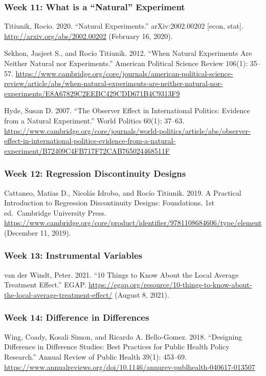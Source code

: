 \documentclass[
  11pt,
]{article}
\begin{document}
\hypertarget{week-11-what-is-a-natural-experiment}{%
\subsubsection{Week 11: What is a ``Natural''
Experiment}\label{week-11-what-is-a-natural-experiment}}

Titiunik, Rocio. 2020. ``Natural Experiments.'' arXiv:2002.00202
{[}econ, stat{]}. \url{http://arxiv.org/abs/2002.00202} (February 16,
2020).

Sekhon, Jasjeet S., and Rocío Titiunik. 2012. ``When Natural Experiments
Are Neither Natural nor Experiments.'' American Political Science Review
106(1): 35--57.
\url{https://www.cambridge.org/core/journals/american-political-science-review/article/abs/when-natural-experiments-are-neither-natural-nor-experiments/E8A67829C2EEBC429CDD671B4C9313F9}

Hyde, Susan D. 2007. ``The Observer Effect in International Politics:
Evidence from a Natural Experiment.'' World Politics 60(1): 37--63.
\url{https://www.cambridge.org/core/journals/world-politics/article/abs/observer-effect-in-international-politics-evidence-from-a-natural-experiment/B72409C4FB717F72CAB765024468511F}

\hypertarget{week-12-regression-discontinuity-designs}{%
\subsubsection{Week 12: Regression Discontinuity
Designs}\label{week-12-regression-discontinuity-designs}}

Cattaneo, Matias D., Nicolás Idrobo, and Rocío Titiunik. 2019. A
Practical Introduction to Regression Discontinuity Designs: Foundations.
1st ed.~Cambridge University Press.
\url{https://www.cambridge.org/core/product/identifier/9781108684606/type/element}
(December 11, 2019).

\hypertarget{week-13-instrumental-variables}{%
\subsubsection{Week 13: Instrumental
Variables}\label{week-13-instrumental-variables}}

van der Windt, Peter. 2021. ``10 Things to Know About the Local Average
Treatment Effect.'' EGAP.
\url{https://egap.org/resource/10-things-to-know-about-the-local-average-treatment-effect/}
(August 8, 2021).

\hypertarget{week-14-difference-in-differences}{%
\subsubsection{Week 14: Difference in
Differences}\label{week-14-difference-in-differences}}

Wing, Coady, Kosali Simon, and Ricardo A. Bello-Gomez. 2018. ``Designing
Difference in Difference Studies: Best Practices for Public Health
Policy Research.'' Annual Review of Public Health 39(1): 453--69.
\url{https://www.annualreviews.org/doi/10.1146/annurev-publhealth-040617-013507}
\end{document}
